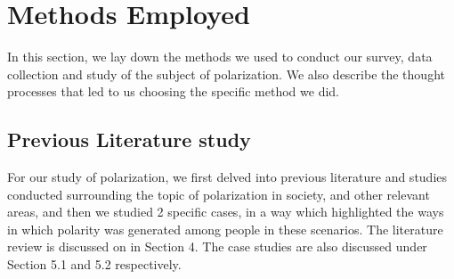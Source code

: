 \documentclass{article}
\begin{document}
\newpage
\section{Methods Employed}
In this section, we lay down the methods we used to conduct our survey, data collection and study of the subject of polarization. We also describe the thought processes that led to us choosing the specific method we did.

\subsection{Previous Literature study}
For our study of polarization, we first delved into previous literature and studies conducted surrounding the topic of polarization in society, and other relevant areas, and then we studied 2 specific cases, in a way which highlighted the ways in which polarity was generated among people in these scenarios. The literature review is discussed on in Section 4. The case studies are also discussed under Section 5.1 and 5.2 respectively.
\end{document}
